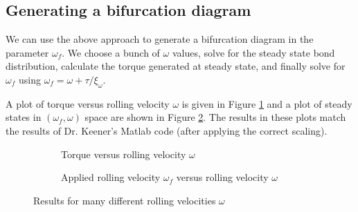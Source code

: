 \documentclass{article}
\begin{document}
\subsection{Generating a bifurcation diagram}
\label{sec:bifurc-diagr}

We can use the above approach to generate a bifurcation diagram in the
parameter $\omega_f$. We choose a bunch of $\omega$ values, solve for
the steady state bond distribution, calculate the torque generated at
steady state, and finally solve for $\omega_f$ using $\omega_f =
\omega + \tau/\xi_\omega$. 

A plot of torque versus rolling velocity
$\omega$ is given in Figure \ref{fig:om-vs-tau} and a plot of steady
states in $(\omega_f, \omega)$ space are shown in Figure
\ref{fig:omf-vs-om}. The results in these plots match the results of
Dr. Keener's Matlab code (after applying the correct scaling).

\begin{figure}
  \centering
  \begin{subfigure}{0.48\linewidth}
    \caption{Torque versus rolling velocity $\omega$}
    \label{fig:om-vs-tau}
  \end{subfigure}
  \hfill
  \begin{subfigure}{0.48\linewidth}
    \caption{Applied rolling velocity $\omega_f$ versus rolling
      velocity $\omega$}
    \label{fig:omf-vs-om}
  \end{subfigure}
  \caption{Results for many different rolling velocities $\omega$}
  \label{fig:bifurcation}
\end{figure}
\end{document}
